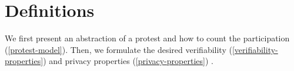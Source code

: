 \section{Definitions}
We first present an abstraction of a protest and how to count the
participation (\cref{protest-model}). Then, we formulate the desired
verifiability (\cref{verifiability-properties}) and privacy properties
(\cref{privacy-properties}) .







